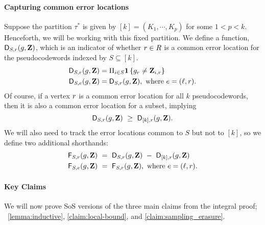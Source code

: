 	\paragraph{Capturing common error locations}
	Suppose the partition $\tau^*$ is given by $[k] = (K_1, \cdots, K_p)$ for some $1<p<k$.  Henceforth, we will be working with this fixed partition. 	We define a function, ${ \mathsf{D} }_{S,{ r }}(g,{ \mathbf{Z} })$, which is an indicator of whether ${ r } \in R$ is a common error location for the pseudocodewords indexed by $S\subseteq [k]$. 
	\begin{align*}
		{ \mathsf{D} }_{S,{ r }}(g, { \mathbf{Z} }) &= \Pi_{i\in S} {{\mathbf{1}} \left\{ g_{{ r }} \neq { \mathbf{Z} }_{i,{ r }} \right\} } \\
		{ \mathsf{D} }_{S,e}(g, { \mathbf{Z} }) &= { \mathsf{D} }_{S,{ r }}(g, { \mathbf{Z} }), \text{ where } e=({ \ell },{ r }).
	\end{align*}
Of course, if a vertex ${ r } $ is a common error location for all $k$ pseudocodewords, then it is also a common error location for a subset, implying
	\[
		{ \mathsf{D} }_{S,{ r }}(g,{ \mathbf{Z} }) ~\geq~ { \mathsf{D} }_{[k],{ r }}(g,{ \mathbf{Z} }).
	\]
	We will also need to track the error locations common to $S$ but not to $[k]$, so we define two additional shorthands:
	\begin{align*}
		{ \mathsf{F} }_{S,{ r }}(g, { \mathbf{Z} }) ~&=~ { \mathsf{D} }_{S,{ r }}(g,{ \mathbf{Z} }) ~-~ { \mathsf{D} }_{[k],{ r }}(g,{ \mathbf{Z} }) \\
		{ \mathsf{F} }_{S,e}(g, { \mathbf{Z} }) ~&=~ { \mathsf{F} }_{S,r}(g, { \mathbf{Z} }), \text{ where } e=({ \ell },{ r }).
	\end{align*}
		

\paragraph{Key Claims}		
		We will now prove SoS versions of the three main claims from the integral proof; ~\cref{lemma:inductive}, \cref{claim:local-bound}, and \cref{claim:sampling_erasure}. 


